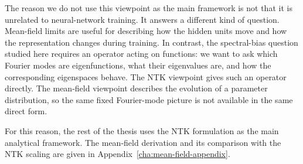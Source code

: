 The reason we do not use this viewpoint as the main framework is not that it is
unrelated to neural-network training. It answers a different kind of question.
Mean-field limits are useful for describing how the hidden units move and how
the representation changes during training. In contrast, the spectral-bias
question studied here requires an operator acting on functions: we want to ask
which Fourier modes are eigenfunctions, what their eigenvalues are, and how the
corresponding eigenspaces behave. The NTK viewpoint gives such an operator
directly. The mean-field viewpoint describes the evolution of a parameter
distribution, so the same fixed Fourier-mode picture is not available in the
same direct form.

For this reason, the rest of the thesis uses the NTK formulation as the main
analytical framework. The mean-field derivation and its comparison with the NTK
scaling are given in Appendix~\ref{cha:mean-field-appendix}.
